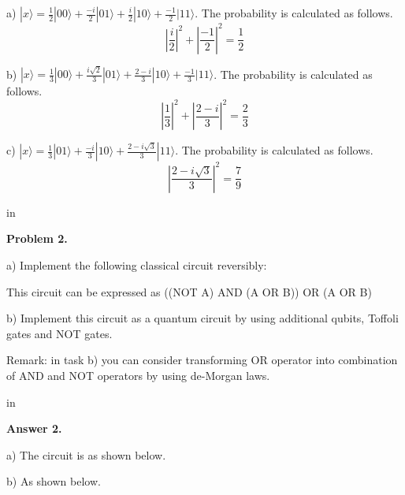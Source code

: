\documentclass[11pt]{article}
\begin{document}
a) $|x\rangle=\frac{1}{2}|00\rangle+\frac{-i}{2}|01\rangle+\frac{i}{2}|10\rangle+\frac{-1}{2}|11\rangle$. The probability is calculated as follows. 
$$
|\frac{i}{2}|^2+|\frac{-1}{2}|^2=\frac{1}{2}
$$

b) $|x\rangle=\frac{1}{3}|00\rangle+\frac{i\sqrt{2}}{3}|01\rangle+\frac{2-i}{3}|10\rangle+\frac{-1}{3}|11\rangle$. The probability is calculated as follows. 
$$
|\frac{1}{3}|^2+|\frac{2-i}{3}|^2=\frac{2}{3}
$$

c) $|x\rangle=\frac{1}{3}|01\rangle+\frac{-i}{3}|10\rangle+\frac{2-i\sqrt{3}}{3}|11\rangle$. The probability is calculated as follows.
$$
|\frac{2-i\sqrt{3}}{3}|^2=\frac{7}{9}
$$

 in

{\bf Problem 2.} 

a) Implement the following classical circuit reversibly:

\begin{figure}[h]
\end{figure}

This circuit can be expressed as ((NOT A) AND (A OR B)) OR (A OR B)

b) Implement this circuit as a quantum circuit by using additional qubits, Toffoli gates and NOT gates.

Remark: in task b) you can consider transforming OR operator into combination of AND 
and NOT operators by using de-Morgan laws.

 in

{\bf Answer 2.} 

a) The circuit is as shown below.
\begin{figure}[h]
\end{figure}
\newpage
b) As shown below.
\begin{figure}[!h]
\end{figure} 
\end{document}
